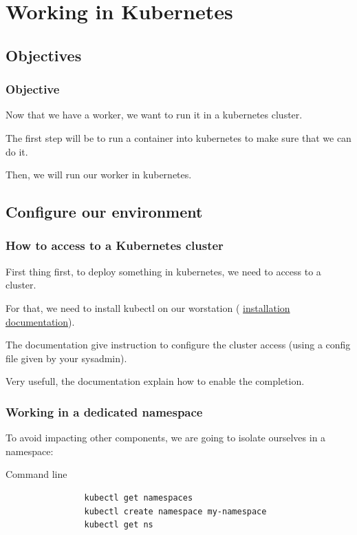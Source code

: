 \section{Working in Kubernetes}

\subsection{Objectives}
	\begin{frame}
		\frametitle{Objective}
		Now that we have a worker, we want to run it in a kubernetes cluster.
		
		\bigskip
		The first step will be to run a container into kubernetes to make sure that we can do it.
		
		Then, we will run our worker in kubernetes.	
	\end{frame}
	
\subsection{Configure our environment}
	
	\begin{frame}
		\frametitle{How to access to a Kubernetes cluster}
		
		First thing first, to deploy something in kubernetes, we need to access to a cluster.
		
		\bigskip
		For that, we need to install kubectl on our worstation ( \href{https://kubernetes.io/docs/tasks/tools/install-kubectl/}{installation documentation}).
		 
		 \bigskip
		The documentation give instruction to configure the cluster access (using a config file given by your sysadmin).

		\bigskip		
		Very usefull, the documentation explain how to enable the completion.
	\end{frame}
	
	\begin{frame}[fragile]
		\frametitle{Working in a dedicated namespace}
		
		To avoid impacting other components, we are going to isolate ourselves in a namespace:
		\begin{block}{Command line}
			\begin{verbatim}
				kubectl get namespaces
				kubectl create namespace my-namespace
				kubectl get ns
			\end{verbatim}
		\end{block}
	\end{frame}
		
